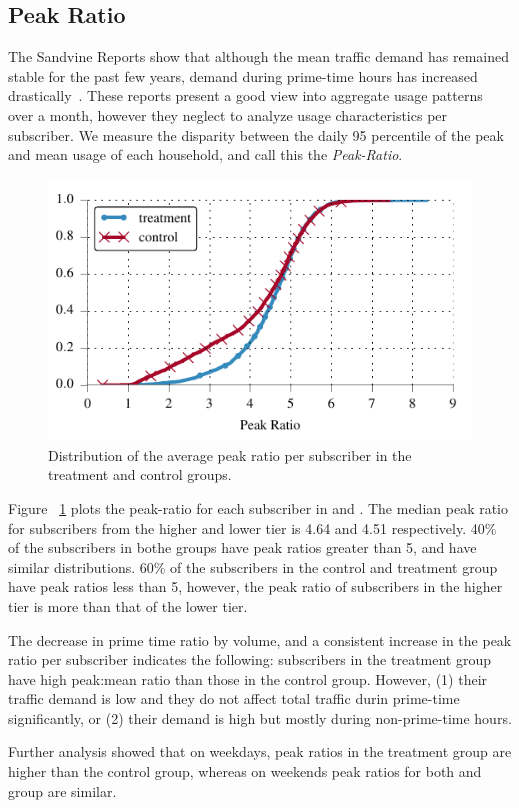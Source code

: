 \subsection{Peak Ratio}\label{subsec:peakratio}

The Sandvine Reports show that although the mean traffic demand has remained
stable for the past few years, demand during prime-time hours has increased
drastically~\cite{sandvine20141h}. These reports present a good view 
into aggregate usage patterns over a month, however they neglect to analyze usage
characteristics per subscriber.
We measure the disparity between the daily 95 percentile of the peak and 
mean usage of each household, and call this the \emph{Peak-Ratio}.

\begin{figure}[t]
\begin{minipage}{1\linewidth}
\centering
\includegraphics[width=1\linewidth]{figures/peakratio_cdf_mean-devices.pdf}
\caption{Distribution of the average peak ratio per subscriber in the treatment and 
control groups.}
\label{fig:CDF-peak-ratio-mean}
\end{minipage}
\end{figure}

Figure ~\ref{fig:CDF-peak-ratio-mean} plots the peak-ratio for each 
subscriber in \treatment{} and \control{}. The median peak
ratio for subscribers from the higher and lower tier is 4.64 and 4.51
respectively. 40\% of the subscribers in bothe groups have peak ratios
greater than 5, and have similar distributions. 60\% of the subscribers
in the control and treatment group have peak ratios less than 5, however,
the peak ratio of subscribers in the higher tier is more than that of the lower
tier.

The decrease in prime time ratio by volume, and a consistent increase
in the peak ratio per subscriber indicates the following: subscribers in the treatment
group have high peak:mean ratio than those in the control group. However, (1) their
traffic demand is low and they do not affect total traffic durin prime-time significantly,
or (2) their demand is high but mostly during non-prime-time hours.

Further analysis showed that on weekdays, peak ratios in the treatment group are higher
than the control group, whereas on weekends peak ratios for both \control{} and \treatment{}
group are similar.
